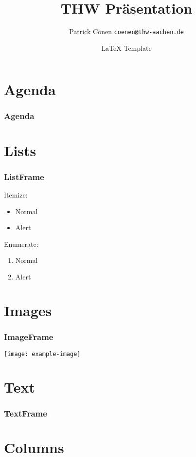 \documentclass{beamer}
\title{THW Präsentation}
\author{Patrick Cönen \texttt{coenen@thw-aachen.de}}
\date{\LaTeX-Template\\\insertauthor}
\begin{document}
\begin{frame}
  \titlepage
\end{frame}

\section*{Agenda}
\begin{frame}
  \frametitle{Agenda}
  \tableofcontents
\end{frame}

\section{Lists}

\begin{frame}
  \frametitle{ListFrame}
  Itemize:
  \begin{itemize}
    \item{Normal}
    \item<alert@1>{Alert}
  \end{itemize}
  Enumerate:
  \begin{enumerate}
    \item{Normal}
    \item<alert@1>{Alert}
  \end{enumerate}
\end{frame}

\section{Images}

\begin{frame}
  \frametitle{ImageFrame}
    \centering
    \texttt{[image: example-image]}
\end{frame}

\section{Text}

\begin{frame}
  \frametitle{TextFrame}
  \small{}
  \blindtext
\end{frame}

\section{Columns}
\end{document}
